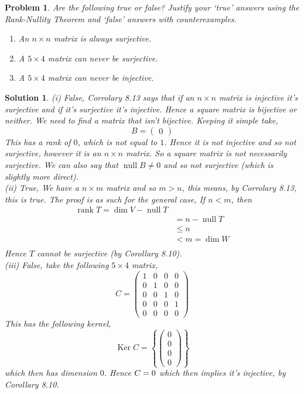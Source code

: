 \documentclass{article}
\renewcommand{\ker}{\operatorname{Ker}}
\newcommand{\Null}{\operatorname{null}}
\DeclareMathOperator{\rank}{rank}
\newtheorem{problem}{Problem}
\newtheorem{solution}{Solution}
\begin{document}
\newpage
\begin{problem}
  Are the following true or false? Justify your ‘true’ answers using the Rank-Nullity Theorem and ‘false’ answers with counterexamples.
  \begin{enumerate}
    \item An $n \times n$ matrix is always surjective.
    \item A $ 5 \times 4$ matrix can never be surjective.
    \item A $5 \times 4$ matrix can never be injective.
  \end{enumerate}
\end{problem}
\begin{solution}
  (i) \quad False, Corrolary 8.13 says that if an $n\times n$ matrix is injective it's surjective and if it's surjective it's injective. Hence a square matrix is bijective or neither. We need to find a matrix that isn't bijective. Keeping it simple take,
  $$ B = \begin{pmatrix}
    0
  \end{pmatrix} $$
  This has a rank of $0$, which is not equal to $1$. Hence it is not injective and so not surjective, however it is an $n\times n$ matrix. So a square matrix is not necessarily surjective. We can also say that $\Null B \ne 0$ and so not surjective (which is slightly more direct).\\

  \noindent
  (ii) \quad True, We have a $n \times m$ matrix and so $m > n$, this means, by Corrolary 8.13, this is true. The proof is as such for the general case, If $n < m$, then
\begin{align*}
  \rank T = \dim V - \Null T\\
  &= n - \Null T\\
  &\le n\\
  &< m = \dim W\\
\end{align*}
Hence $T$ cannot be surjective (by Corollary 8.10).\\

\noindent
(iii) \quad False, take the following $5 \times 4$ matrix,
$$ C = \begin{pmatrix}
  1 & 0 & 0 & 0\\
  0 & 1 & 0 & 0\\
  0 & 0 & 1 & 0 \\
  0 & 0 & 0 & 1 \\
  0 & 0 & 0 & 0
\end{pmatrix} $$
This has the following kernel,
$$ \ker C = \left\{ \begin{pmatrix}
  0 \\ 0 \\ 0 \\ 0
\end{pmatrix} \right\} $$
which then has dimension $0$. Hence $\null C = 0$ which then implies it's injective, by Corollary 8.10.
\end{solution}
\end{document}
